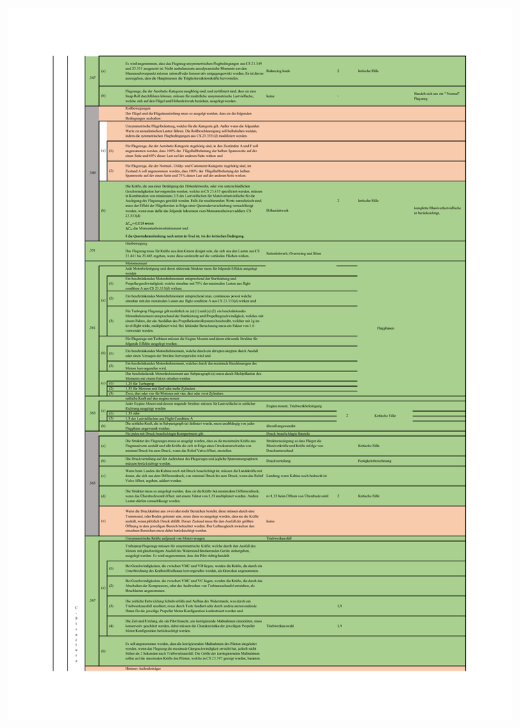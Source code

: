 \begin{table}[H]
\centering
\includegraphics[width=1.0\textwidth, trim={19mm 19mm 19mm 19mm}, clip]{bilder/Tabellen/MPP_Konstruktion_3.pdf}
\end{table}

